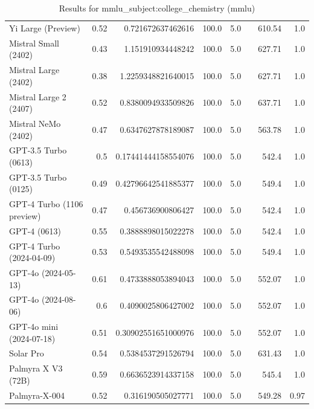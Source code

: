 \begin{table}[htp]
{\begin{tabular}{lrrrrrrr}
Yi Large (Preview) & 0.52 & 0.721672637462616 & 100.0 & 5.0 &  & 610.54 & 1.0 \\
Mistral Small (2402) & 0.43 & 1.151910934448242 & 100.0 & 5.0 &  & 627.71 & 1.0 \\
Mistral Large (2402) & 0.38 & 1.2259348821640015 & 100.0 & 5.0 &  & 627.71 & 1.0 \\
Mistral Large 2 (2407) & 0.52 & 0.8380094933509826 & 100.0 & 5.0 &  & 637.71 & 1.0 \\
Mistral NeMo (2402) & 0.47 & 0.6347627878189087 & 100.0 & 5.0 &  & 563.78 & 1.0 \\
GPT-3.5 Turbo (0613) & 0.5 & 0.17441444158554076 & 100.0 & 5.0 &  & 542.4 & 1.0 \\
GPT-3.5 Turbo (0125) & 0.49 & 0.42796642541885377 & 100.0 & 5.0 &  & 549.4 & 1.0 \\
GPT-4 Turbo (1106 preview) & 0.47 & 0.456736900806427 & 100.0 & 5.0 &  & 542.4 & 1.0 \\
GPT-4 (0613) & 0.55 & 0.3888898015022278 & 100.0 & 5.0 &  & 542.4 & 1.0 \\
GPT-4 Turbo (2024-04-09) & 0.53 & 0.5493535542488098 & 100.0 & 5.0 &  & 549.4 & 1.0 \\
GPT-4o (2024-05-13) & 0.61 & 0.4733888053894043 & 100.0 & 5.0 &  & 552.07 & 1.0 \\
GPT-4o (2024-08-06) & 0.6 & 0.4090025806427002 & 100.0 & 5.0 &  & 552.07 & 1.0 \\
GPT-4o mini (2024-07-18) & 0.51 & 0.30902551651000976 & 100.0 & 5.0 &  & 552.07 & 1.0 \\
Solar Pro & 0.54 & 0.5384537291526794 & 100.0 & 5.0 &  & 631.43 & 1.0 \\
Palmyra X V3 (72B) & 0.59 & 0.6636523914337158 & 100.0 & 5.0 &  & 545.4 & 1.0 \\
Palmyra-X-004 & 0.52 & 0.316190505027771 & 100.0 & 5.0 &  & 549.28 & 0.97 \\
\bottomrule
\end{tabular}}
\caption{Results for mmlu_subject:college_chemistry (mmlu)}
\label{fig:mmlu_subject:college_chemistry (mmlu)}
\end{table}